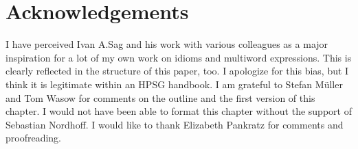 \documentclass[output=paper
	        ,collection
	        ,collectionchapter
 	        ,biblatex
                ,babelshorthands
                ,newtxmath
                ,draftmode
                ,colorlinks, citecolor=brown
]{langscibook}
\begin{document}
\section*{Acknowledgements}

I have perceived Ivan A.\@ Sag and his work with various colleagues as a major inspiration for a lot of my own work on idioms and multiword expressions. 
This is clearly reflected in the structure of this paper, too. 
I apologize for this bias, but I think it is legitimate within an HPSG handbook.
%
I am grateful to Stefan Müller and Tom Wasow for comments on the outline and the first version of this chapter. 
%
I would not have been able to format this chapter without the support of Sebastian Nordhoff.
%
I would like to thank Elizabeth Pankratz for comments and proofreading.

{\sloppy
\printbibliography[heading=subbibliography,notkeyword=this] }
\end{document}
